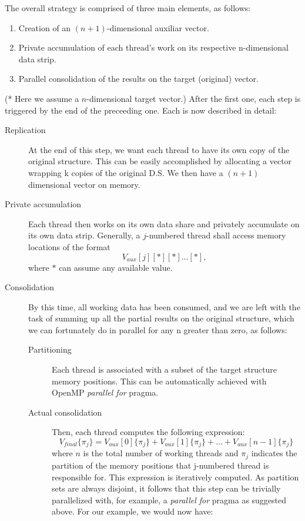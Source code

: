 \documentclass[10pt,a4paper]{report}
\begin{document}
The overall strategy is comprised of three main elements, as follows:
\begin{enumerate}
\item Creation of an \((n+1)\)-dimensional auxiliar vector.
\item Private accumulation of each thread's work on its respective n-dimensional data strip.
\item Parallel consolidation of the results on the target (original) vector.
\end{enumerate}
(* Here we assume a $n$-dimensional target vector.)
After the first one, each step is triggered by the end of the preceeding one. Each is now described in detail:	     
\begin{description}
\item[Replication]
At the end of this step, we want each thread to have its own copy of the original structure. This can be easily accomplished by allocating a vector wrapping k copies of the original D.S. We then have a $(n+1)$ dimensional vector on memory.	     	   
\item[Private accumulation]
Each thread then works on its own data share and privately accumulate on its own data strip. Generally, a $j$-numbered thread shall access memory locations of the format \[V_{aux}[j][*][*]\ldots[*],\]where $*$ can assume any available value.
\item[Consolidation]
By this time, all working data has been consumed, and we are left with the task of summing up all the partial results on the original structure, which we can fortunately do in parallel for any n greater than zero, as follows:
\begin{description}	     	   
\item[Partitioning]
Each thread is associated with a subset of the target structure memory positions.
This can be automatically achieved with OpenMP \emph{parallel for} pragma.
\item[Actual consolidation]
Then, each thread computes the following expression:	     	   
\[V_{final}\{\pi_j\}=V_{aux}[0]\{\pi_j\}+V_{aux}[1]\{\pi_j\}+\ldots+V_{aux}[n-1]\{\pi_j\}\]
	     	   where \(n \) is the total number of working threads and \(\pi_j\) indicates the partition of the memory positions that j-numbered thread is responsible for. This expression is iteratively computed. As partition sets are always disjoint, it follows that this step can be trivially parallelized with, for example, a \emph{parallel for} pragma as suggested above.
\newline 
\newline
For our example, we would now have:


\end{description}
\end{description}
\end{document}
